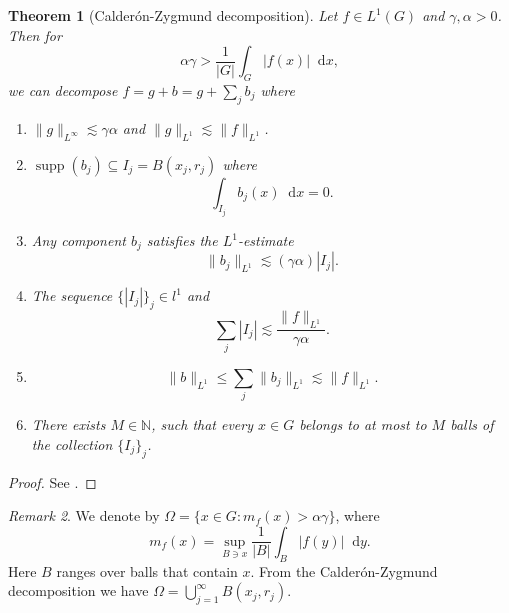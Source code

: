 \documentclass[12pt, reqno]{amsart}
\newtheorem{theorem}{Theorem}[section]
\theoremstyle{definition}
\theoremstyle{remark}
\newtheorem{remark}[theorem]{Remark}
\numberwithin{equation}{section}
\newcommand*\diff{\mathop{}\!\mathrm{d}}
\begin{document}
\begin{theorem}[Calderón-Zygmund decomposition]\label{CZ}
    Let $f\in L^1(G)$ and $\gamma,\alpha>0$. Then for 
    \begin{equation*}
        \alpha\gamma>\frac{1}{|G|}\int_{G}|f(x)|\diff{x},
    \end{equation*}
    we can decompose $f=g+b=g+\sum_{j}b_j$ where 
    \begin{enumerate}
        \item $\|g\|_{L^\infty}\lesssim\gamma\alpha$ and $\|g\|_{L^1}\lesssim\|f\|_{L^1}$.
        \item $\operatorname{supp}(b_j)\subseteq I_j=B(x_j,r_j)$ where 
        \begin{equation*}
            \int_{I_j}b_j(x)\diff{x}=0.
        \end{equation*}
        \item Any component $b_j$ satisfies the $L^1$-estimate
        \begin{equation*}
            \|b_j\|_{L^1}\lesssim(\gamma\alpha)|I_j|.
        \end{equation*}
        \item The sequence $\{|I_j|\}_{j}\in l^{1}$ and 
        \begin{equation*}
            \sum_{j}|I_j|\lesssim\frac{\|f\|_{L^1}}{\gamma\alpha}.
        \end{equation*}
        \item 
        \begin{equation*}
            \|b\|_{L^1}\leq\sum_{j}\|b_j\|_{L^1}\lesssim\|f\|_{L^1}.
        \end{equation*}
        \item There exists $M\in\mathbb{N}$, such that every $x\in G$ belongs to at most to $M$ balls of the collection $\{I_j\}_j$.
    \end{enumerate}
\end{theorem}
\begin{proof}
    See \cite{7}.
\end{proof}
\begin{remark}\normalfont
We denote by $\Omega=\{x\in G: m_f(x)>\alpha\gamma\}$, where 
    \begin{equation*}
        m_f(x)=\sup_{B \ni x}\frac{1}{|B|}\int_{B}|f(y)|\diff{y}.
    \end{equation*}
Here $B$ ranges over balls that contain $x$. From the Calderón-Zygmund decomposition we have $\Omega=\bigcup_{j=1}^{\infty}B(x_j,r_j)$.
\end{remark}
\end{document}
